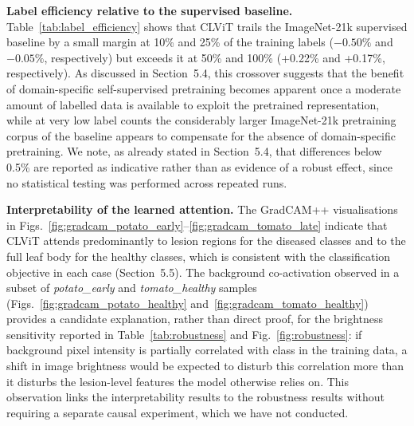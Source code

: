 \documentclass[conference]{IEEEtran}
\begin{document}
\textbf{Label efficiency relative to the supervised baseline.}
Table~\ref{tab:label_efficiency} shows that CLViT trails the ImageNet-21k supervised baseline by a small margin at 10\% and 25\% of the training labels ($-0.50\%$ and $-0.05\%$, respectively) but exceeds it at 50\% and 100\% (+0.22\% and +0.17\%, respectively). As discussed in Section~5.4, this crossover suggests that the benefit of domain-specific self-supervised pretraining becomes apparent once a moderate amount of labelled data is available to exploit the pretrained representation, while at very low label counts the considerably larger ImageNet-21k pretraining corpus of the baseline appears to compensate for the absence of domain-specific pretraining. We note, as already stated in Section~5.4, that differences below 0.5\% are reported as indicative rather than as evidence of a robust effect, since no statistical testing was performed across repeated runs.

\textbf{Interpretability of the learned attention.}
The GradCAM++ visualisations in Figs.~\ref{fig:gradcam_potato_early}--\ref{fig:gradcam_tomato_late} indicate that CLViT attends predominantly to lesion regions for the diseased classes and to the full leaf body for the healthy classes, which is consistent with the classification objective in each case (Section~5.5). The background co-activation observed in a subset of \textit{potato\_early} and \textit{tomato\_healthy} samples (Figs.~\ref{fig:gradcam_potato_healthy} and~\ref{fig:gradcam_tomato_healthy}) provides a candidate explanation, rather than direct proof, for the brightness sensitivity reported in Table~\ref{tab:robustness} and Fig.~\ref{fig:robustness}: if background pixel intensity is partially correlated with class in the training data, a shift in image brightness would be expected to disturb this correlation more than it disturbs the lesion-level features the model otherwise relies on. This observation links the interpretability results to the robustness results without requiring a separate causal experiment, which we have not conducted.
\end{document}
